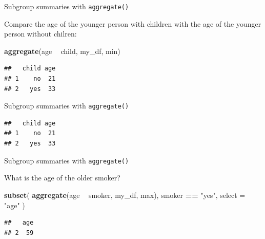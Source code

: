 \documentclass[ignorenonframetext,]{beamer}
\newenvironment{Shaded}{\begin{snugshade}}{\end{snugshade}}
\newcommand{\DataTypeTok}[1]{\textcolor[rgb]{0.13,0.29,0.53}{#1}}
\newcommand{\KeywordTok}[1]{\textcolor[rgb]{0.13,0.29,0.53}{\textbf{#1}}}
\newcommand{\NormalTok}[1]{#1}
\newcommand{\OperatorTok}[1]{\textcolor[rgb]{0.81,0.36,0.00}{\textbf{#1}}}
\newcommand{\StringTok}[1]{\textcolor[rgb]{0.31,0.60,0.02}{#1}}
\begin{document}
\begin{frame}[fragile]{Subgroup summaries with \texttt{aggregate()}}
\protect\hypertarget{subgroup-summaries-with-aggregate-15}{}

Compare the age of the younger person with children with the age of the
younger person without chilren:

\begin{Shaded}
\begin{Highlighting}[]
\KeywordTok{aggregate}\NormalTok{(age }\OperatorTok{~}\StringTok{ }\NormalTok{child, my_df, min)}
\end{Highlighting}
\end{Shaded}

\begin{verbatim}
##   child age
## 1    no  21
## 2   yes  33
\end{verbatim}

\end{frame}

\begin{frame}[fragile]{Subgroup summaries with \texttt{aggregate()}}
\protect\hypertarget{subgroup-summaries-with-aggregate-16}{}

\begin{Shaded}
\end{Shaded}

\begin{verbatim}
##   child age
## 1    no  21
## 2   yes  33
\end{verbatim}

\end{frame}

\begin{frame}[fragile]{Subgroup summaries with \texttt{aggregate()}}
\protect\hypertarget{subgroup-summaries-with-aggregate-17}{}

What is the age of the older smoker?

\begin{Shaded}
\begin{Highlighting}[]
\KeywordTok{subset}\NormalTok{(}
  \KeywordTok{aggregate}\NormalTok{(age }\OperatorTok{~}\StringTok{ }\NormalTok{smoker, my_df, max),}
\NormalTok{  smoker }\OperatorTok{==}\StringTok{ "yes"}\NormalTok{, }
  \DataTypeTok{select =} \StringTok{"age"}
\NormalTok{  )}
\end{Highlighting}
\end{Shaded}

\begin{verbatim}
##   age
## 2  59
\end{verbatim}

\end{frame}
\end{document}
